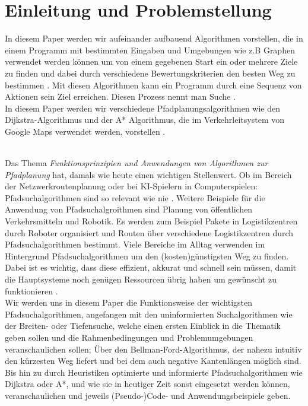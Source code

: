 
\chapter{Einleitung und Problemstellung}
\label{Einleitung und Problemstellung}


In diesem Paper werden wir aufeinander aufbauend Algorithmen vorstellen, die in einem Programm mit bestimmten Eingaben und Umgebungen 
wie z.B Graphen verwendet werden können um von einem gegebenen Start ein oder mehrere Ziele zu finden und dabei durch verschiedene Bewertungskriterien den besten Weg zu bestimmen \cite{Esri:00}.
Mit diesen Algorithmen kann ein Programm durch eine Sequenz von Aktionen sein Ziel erreichen. Diesen Prozess nennt man Suche \cite{Russell:10c}. \\


\noindent 
In diesem Paper werden wir verschiedene Pfadplanungsalgorithmen wie den Dijkstra-Algorithmus und der A* Algorithmus, 
die im Verkehrleitsystem von Google Maps verwendet werden, vorstellen \cite{Mehta:19}. 

\noindent \\
Das Thema \emph{Funktionsprinzipien und Anwendungen von Algorithmen zur Pfadplanung} hat, damals wie heute einen wichtigen Stellenwert. 
Ob im Bereich der Netzwerkroutenplanung oder bei KI-Spielern in Computerspielen: Pfadsuchalgorithmen sind so relevant wie nie \cite{Foeada:21}. 
Weitere Beispiele für die Anwendung von Pfadsuchalgroithmen sind Planung von öffentlichen Verkehrsmitteln und 
Robotik. Es werden zum Beispiel Pakete in Logistikzentren durch Roboter organisiert und Routen über verschiedene Logistikzentren durch Pfadsuchalgorithmen bestimmt.
Viele Bereiche im Alltag verwenden im Hintergrund Pfadsuchalgorithmen um den (kosten)günstigsten Weg zu finden. Dabei ist es wichtig, 
dass diese effizient, akkurat und schnell sein müssen, damit die Hauptsysteme noch genügen Ressourcen übrig haben um gewünscht zu funktionieren \cite{Foeada:21}. 
\noindent \\
Wir werden uns in diesem Paper die Funktionsweise der wichtigsten Pfadsuchalgorithmen, angefangen mit den uninformierten Suchalgorithmen wie der Breiten- oder Tiefensuche, 
welche einen ersten Einblick in die Thematik geben sollen und die Rahmenbedingungen und Problemumgebungen veranschaulichen sollen; 
Über den Bellman-Ford-Algorithmus, der nahezu intuitiv den kürzesten Weg liefert und bei dem auch negative Kantenlängen möglich sind\cite{Mukhlif:20}. 
Bis hin zu durch Heuristiken optimierte und informierte Pfadsuchalgorithmen wie Dijkstra oder A*, und wie sie in heutiger Zeit 
sonst eingesetzt werden können, veranschaulichen und jeweils (Pseudo-)Code- und Anwendungsbeispiele geben\cite{Russell:10a}.
